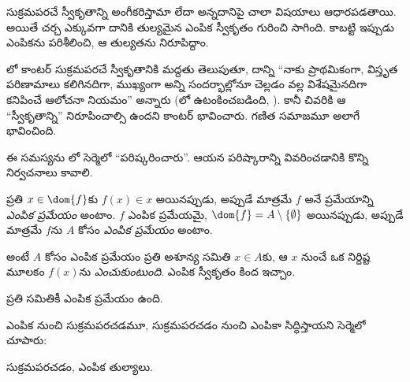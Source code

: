 \documentclass[../../../include/open-logic-section]{subfiles}
\begin{document}

సుక్రమపరచే స్వీకృతాన్ని అంగీకరిస్తామా లేదా అన్నదానిపై చాలా
విషయాలు ఆధారపడతాయి. అయితే చర్చ ఎక్కువగా దానికి
తుల్యమైన ఎంపిక స్వీకృతం గురించి సాగింది. కాబట్టి
ఇప్పుడు ఎంపికను పరిశీలించి, ఆ తుల్యతను నిరూపిద్దాం.

\citeyear{Cantor1883}లో కాంటర్ సుక్రమపరచే స్వీకృతానికి మద్దతు తెలుపుతూ, దాన్ని ``నాకు ప్రాథమికంగా, విస్తృత పరిణామాలు కలిగినదిగా, ముఖ్యంగా అన్ని సందర్భాల్లోనూ చెల్లడం వల్ల విశేషమైనదిగా కనిపించే ఆలోచనా నియమం'' అన్నారు (\citeauthor{Potter2004}లో ఉటంకించబడింది, \citeyear[p.~243]{Potter2004}). కానీ చివరికి ఆ ``స్వీకృతాన్ని'' నిరూపించాల్సి ఉందని కాంటర్ భావించారు. గణిత సమాజమూ అలాగే భావించింది.

ఈ సమస్యను \citeyear{Zermelo1904}లో సెర్మెలో ``పరిష్కరించారు''. ఆయన పరిష్కారాన్ని వివరించడానికి కొన్ని నిర్వచనాలు కావాలి.

\begin{defn}
ప్రతి $x \in \dom{f}$కు $f(x) \in x$ అయినప్పుడు, అప్పుడే మాత్రమే $f$ అనే ప్రమేయాన్ని \emph{ఎంపిక ప్రమేయం} అంటాం. $f$ ఎంపిక ప్రమేయమై, $\dom{f} = A \setminus \{\emptyset\}$ అయినప్పుడు, అప్పుడే మాత్రమే $f$ను $A$ కోసం \emph{ఎంపిక ప్రమేయం} అంటాం.
\end{defn}

అంటే $A$ కోసం ఎంపిక ప్రమేయం ప్రతి అశూన్య సమితి
$x \in A$కు, ఆ $x$ నుంచే ఒక నిర్దిష్ట మూలకం $f(x)$ను \emph{ఎంచుకుంటుంది}. ఎంపిక స్వీకృతం కింద ఇచ్చాం.

\begin{axiom}[ఎంపిక]
	ప్రతి సమితికీ ఎంపిక ప్రమేయం ఉంది.
\end{axiom}

ఎంపిక నుంచి సుక్రమపరచడమూ, సుక్రమపరచడం నుంచి ఎంపికా సిద్ధిస్తాయని సెర్మెలో చూపారు:

\begin{thm}[$\ZF$లో]
సుక్రమపరచడం, ఎంపిక తుల్యాలు.
\end{thm}
\end{document}
